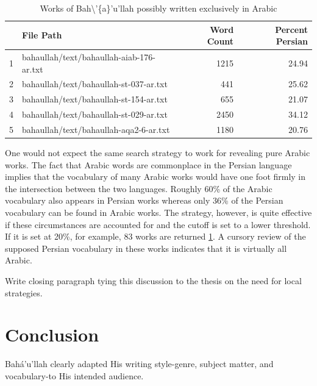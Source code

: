 \documentclass[12pt, oneside]{report}
\begin{document}
\begin{table}[]
	\centering
		\begin{tabular}{|l|l|r|r|}
			\hline
			\rowcolor[HTML]{EFEFEF}
			\textbf{} & \textbf{File Path}                       & \textbf{Word Count}          & \textbf{Percent Persian}      \\ \hline
1         & bahaullah/text/bahaullah-aiab-176-ar.txt & \cellcolor[HTML]{FFFFFF}1215 & \cellcolor[HTML]{FFFFFF}24.94 \\ \hline
			\rowcolor[HTML]{EFEFEF}
2         & bahaullah/text/bahaullah-st-037-ar.txt   & 441                          & 25.62                         \\ \hline
			\rowcolor[HTML]{FFFFFF}
3         & bahaullah/text/bahaullah-st-154-ar.txt   & 655                          & 21.07                         \\ \hline
			\rowcolor[HTML]{EFEFEF}
4         & bahaullah/text/bahaullah-st-029-ar.txt   & 2450                         & 34.12                         \\ \hline
			\rowcolor[HTML]{FFFFFF}
5         & bahaullah/text/bahaullah-aqa2-6-ar.txt   & 1180                         & 20.76                         \\ \hline
\end{tabular}
\caption{Works of Bah\textbackslash{}'\{a\}'u'llah possibly written exclusively in Arabic }
\label{tab:pure-arabic}
\end{table}
\par
One would not expect the same search strategy to work for revealing pure Arabic works.
The fact that Arabic words are commonplace in the Persian language implies that the vocabulary of many Arabic works would have one foot firmly in the intersection between the two languages.
Roughly 60\% of the Arabic vocabulary also appears in Persian works whereas only 36\% of the Persian vocabulary can be found in Arabic works.
The strategy, however, is quite effective if these circumstances are accounted for and the cutoff is set to a lower threshold.
If it is set at 20\%, for example, 83 works are returned \ref{tab:pure-arabic}.
A cursory review of the supposed Persian vocabulary in these works indicates that it is virtually all Arabic.
\par
Write closing paragraph tying this discussion to the thesis on the need for local strategies.


\section{Conclusion}
Bah\'{a}'u'llah clearly adapted His writing style-genre, subject matter, and vocabulary-to His intended audience.
\end{document}

